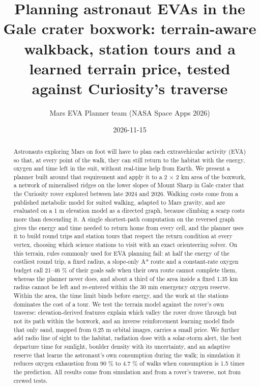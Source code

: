 \documentclass[11pt,a4paper]{article}
\title{Planning astronaut EVAs in the Gale crater boxwork: terrain-aware walkback, station tours and a learned terrain price, tested against Curiosity's traverse}
\author{Mars EVA Planner team (NASA Space Apps 2026)}
\date{2026-11-15}
\begin{document}
\maketitle

\begin{abstract}

Astronauts exploring Mars on foot will have to plan each extravehicular activity (EVA) so that, at every point of the walk, they can still return to the habitat with the energy, oxygen and time left in the suit, without real-time help from Earth. We present a planner built around that requirement and apply it to a 2 $\times$ 2 km area of the boxwork, a network of mineralised ridges on the lower slopes of Mount Sharp in Gale crater that the Curiosity rover explored between late 2024 and 2026. Walking costs come from a published metabolic model for suited walking, adapted to Mars gravity, and are evaluated on a 1 m elevation model as a directed graph, because climbing a scarp costs more than descending it. A single shortest-path computation on the reversed graph gives the energy and time needed to return home from every cell, and the planner uses it to build round trips and station tours that respect the return condition at every vertex, choosing which science stations to visit with an exact orienteering solver. On this terrain, rules commonly used for EVA planning fail: at half the energy of the costliest round trip, a fixed radius, a slope-only A* route and a constant-rate oxygen budget call 21--46 \% of their goals safe when their own route cannot complete them, whereas the planner never does, and about a third of the area inside a fixed 1.35 km radius cannot be left and re-entered within the 30 min emergency oxygen reserve. Within the area, the time limit binds before energy, and the work at the stations dominates the cost of a tour. We test the terrain model against the rover's own traverse: elevation-derived features explain which valley the rover drove through but not its path within the boxwork, and an inverse reinforcement learning model finds that only sand, mapped from 0.25 m orbital images, carries a small price. We further add radio line of sight to the habitat, radiation dose with a solar-storm alert, the best departure time for sunlight, boulder density with its uncertainty, and an adaptive reserve that learns the astronaut's own consumption during the walk; in simulation it reduces oxygen exhaustion from 90 \% to 4.7 \% of walks when consumption is 1.5 times the prediction. All results come from simulation and from a rover's traverse, not from crewed tests.

\end{abstract}
\end{document}

